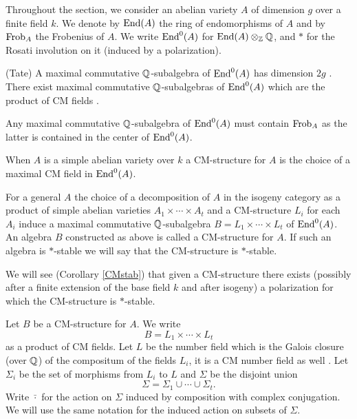 \documentclass[11pt]{amsart}
\begin{document}
Throughout the section, we consider an abelian variety $A$ of dimension $g$ over a finite field $k$. We denote by $\textnormal{End}(A)$ the ring of endomorphisms of $A$ and by $\textnormal{Frob}_A$ the Frobenius of $A$. We write $\textnormal{End}^0(A)$ for $\textnormal{End}(A)\otimes_{\mathbb{Z}} \mathbb{Q}$,  and $*$ for the Rosati involution on it (induced by a polarization).

\begin{theorem}(Tate)\label{tate} A maximal  commutative $\mathbb{Q}$-subalgebra of $\textnormal{End}^0(A)$ has dimension $2g$ \cite{Tate}. There exist maximal commutative $\mathbb{Q}$-subalgebras of $\textnormal{End}^0(A)$ which are the product of CM fields \cite[Lemma 2]{TateBour}.\end{theorem}
\begin{remark}\label{remfrob}
Any maximal commutative $\mathbb{Q}$-subalgebra of $\textnormal{End}^0(A)$ must contain  $\textnormal{Frob}_A$ as the latter is contained in the center of $\textnormal{End}^0(A)$. 
\end{remark}
\begin{definition}\label{definitionCM} 
When $A$ is a simple abelian variety over $k$ a CM-structure for $A$ is the choice of a maximal CM field in $\textnormal{End}^0(A)$. 

For a general $A$ the choice of a decomposition of $A$  in the isogeny category as a product of simple abelian varieties $A_1\times \cdots\times A_t$ and a  CM-structure $L_i$ for each $A_i$ induce a maximal commutative $\mathbb{Q}$-subalgebra ${B=L_1\times \cdots\times L_t}$ of $\textnormal{End}^0(A)$. An algebra $B$  constructed as above  is called a CM-structure for $A$. If such an algebra is $*$-stable we will say that the CM-structure is $*$-stable.
\end{definition}
\begin{remark}
We will see (Corollary \ref{CMstab}) that given a CM-structure there exists (possibly after a finite extension of the base field $k$ and after isogeny) a polarization for which  the CM-structure is $*$-stable.
\end{remark}


\begin{notation}\label{NotationCM}
Let $B$ be a CM-structure for $A$. We write \[{B=L_1\times \cdots\times L_t}\] as a product of CM fields. Let 
 $L$ be the number field which is the Galois closure (over $\mathbb{Q}$) of the compositum of the fields $L_i$, it is a CM number field as well \cite[Proposition 5.12]{goro}. Let $\Sigma_i$ be the set of morphisms from $L_i$ to $L$ and   $\Sigma$ be the disjoint union 
 \[\Sigma = \Sigma_1\cup\cdots \cup \Sigma_t.\]
Write $\bar{\cdot}$ for the action on $\Sigma$ induced by composition with  complex conjugation. We will use the same notation for the induced action on subsets of  $\Sigma$.
\end{notation}
\end{document}
